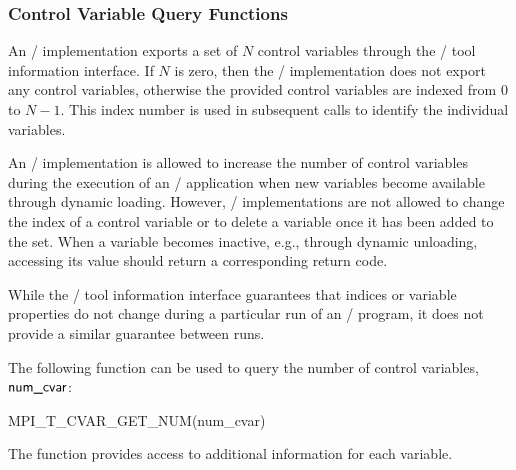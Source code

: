 \subsubsection{Control Variable Query Functions}

An \MPI/ implementation exports a set of $N$ control variables through the
\MPI/ tool information interface.  If $N$ is zero, then the \MPI/
implementation does not export any control variables, otherwise the
provided control variables are indexed from $0$ to $N-1$.  This index
number is used in subsequent calls to identify the individual variables.

An \MPI/ implementation is allowed to increase the number of control
variables during the execution of an \MPI/ application when new variables
become available through dynamic loading.  However, \MPI/ implementations
are not allowed to change the index of a control variable or to delete a
variable once it has been added to the set.  When a variable becomes
inactive, e.g., through dynamic unloading, accessing its value should
return a corresponding return code.

\begin{users}
While the \MPI/ tool information interface guarantees that indices or
variable properties do not change during a particular run of an \MPI/
program, it does not provide a similar guarantee between runs.
\end{users}

The following function can be used to query the number of control
variables, $\mpiarg{num\_cvar}$:

\begin{funcdef}{MPI\_T\_CVAR\_GET\_NUM}{(\mbox{num\_cvar})}
\end{funcdef}

The function  provides access to
additional information for each variable.

